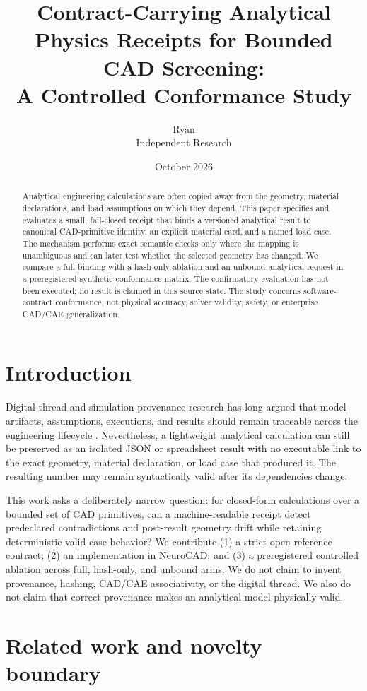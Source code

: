 \documentclass[10pt]{article}
\title{Contract-Carrying Analytical Physics Receipts for Bounded CAD Screening:\\A Controlled Conformance Study}
\author{Ryan\\Independent Research}
\date{October 2026}
\newcommand{\ResultAbstract}{The confirmatory evaluation has not been executed; no result is claimed in this source state.}
\begin{document}
\maketitle

\begin{abstract}
Analytical engineering calculations are often copied away from the geometry,
material declarations, and load assumptions on which they depend. This paper
specifies and evaluates a small, fail-closed receipt that binds a versioned
analytical result to canonical CAD-primitive identity, an explicit material
card, and a named load case. The mechanism performs exact semantic checks only
where the mapping is unambiguous and can later test whether the selected
geometry has changed. We compare a full binding with a hash-only ablation and
an unbound analytical request in a preregistered synthetic conformance matrix.
\ResultAbstract{} The study concerns software-contract conformance, not physical
accuracy, solver validity, safety, or enterprise CAD/CAE generalization.
\end{abstract}

\section{Introduction}

Digital-thread and simulation-provenance research has long argued that model
artifacts, assumptions, executions, and results should remain traceable across
the engineering lifecycle \cite{hedberg2016,helu2017,nistthread,w3cprov}.
Nevertheless, a lightweight analytical calculation can still be preserved as
an isolated JSON or spreadsheet result with no executable link to the exact
geometry, material declaration, or load case that produced it. The resulting
number may remain syntactically valid after its dependencies change.

This work asks a deliberately narrow question: for closed-form calculations
over a bounded set of CAD primitives, can a machine-readable receipt detect
predeclared contradictions and post-result geometry drift while retaining
deterministic valid-case behavior? We contribute (1) a strict open reference
contract; (2) an implementation in NeuroCAD; and (3) a preregistered controlled
ablation across full, hash-only, and unbound arms. We do not claim to invent
provenance, hashing, CAD/CAE associativity, or the digital thread. We also do
not claim that correct provenance makes an analytical model physically valid.

\section{Related work and novelty boundary}
\end{document}
